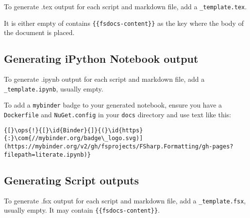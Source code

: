 \documentclass{article}
\newcommand{\id}[1]{\textcolor{black}{#1}}
\newcommand{\com}[1]{\textcolor{officegreen}{#1}}
\newcommand{\ops}[1]{\textcolor{purple}{#1}}
\begin{document}
To generate .tex output for each script and markdown file, add a \texttt{\_template.tex}.


It is either empty of contains \texttt{\{\{fsdocs-content\}\}} as the key where the body
of the document is placed.
\subsection*{Generating iPython Notebook output}



To generate .ipynb output for each script and markdown file, add a \texttt{\_template.ipynb}, usually empty.


To add a \texttt{mybinder} badge to your generated notebook, ensure you have a \texttt{Dockerfile} and \texttt{NuGet.config}
in your \texttt{docs} directory and use text like this:
\begin{Verbatim}[commandchars=\\\{\}]
{[}\ops{!}{[}\id{Binder}{]}{(}\id{https}{:}\com{//mybinder.org/badge\_logo.svg)](https://mybinder.org/v2/gh/fsprojects/FSharp.Formatting/gh-pages?filepath=literate.ipynb)}

\end{Verbatim}

\subsection*{Generating Script outputs}



To generate .fsx output for each script and markdown file, add a \texttt{\_template.fsx}, usually empty.
It may contain \texttt{\{\{fsdocs-content\}\}}.
\end{document}
